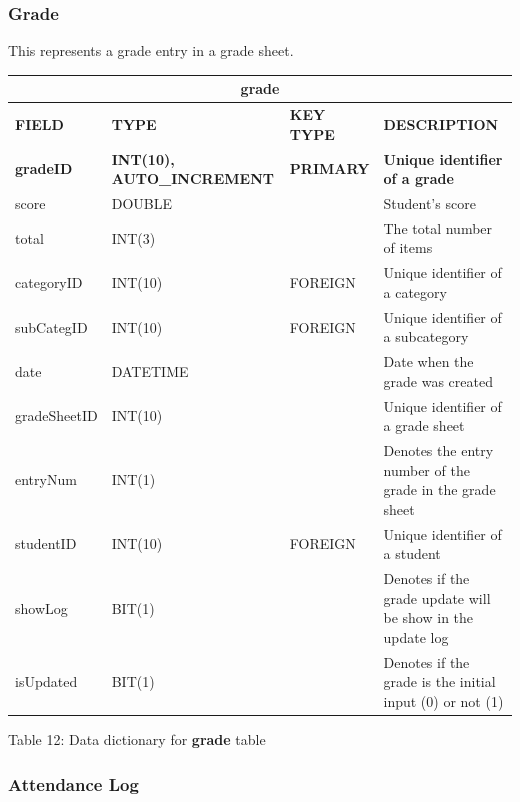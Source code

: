 \documentclass[11pt,a4paper,titlepage]{article}
\begin{document}
\subsubsection{Grade}

This represents a grade entry in a grade sheet.

\vspace{1cm}
\begin{longtable}{ |p{2.5cm}|p{4.5cm}|p{2.5cm}|p{3cm}|  }
    \hline
    \multicolumn{4}{|c|}{\textbf{grade}} \\
    \hline
    \textbf{FIELD}&\textbf{TYPE}&\textbf{KEY TYPE}&\textbf{DESCRIPTION}\\
    \hline
    \textbf{gradeID}  & \textbf{INT(10), AUTO\_INCREMENT} & \textbf{PRIMARY} & \textbf{Unique identifier of a grade}\\ \hline
    score   & DOUBLE   & & Student's score \\ \hline
    total   & INT(3)   & & The total number of items \\ \hline
    categoryID   & INT(10)   & FOREIGN & Unique identifier of a category \\ \hline
    subCategID   & INT(10)   & FOREIGN & Unique identifier of a subcategory \\ \hline
    date   & DATETIME   & & Date when the grade was created \\ \hline
    gradeSheetID   & INT(10)   & & Unique identifier of a grade sheet \\ \hline
    entryNum   & INT(1)   & & Denotes the entry number of the grade in the grade sheet \\ \hline
    studentID   & INT(10)   & FOREIGN & Unique identifier of a student \\ \hline
    showLog & BIT(1) & &  Denotes if the grade update will be show in the update log \\ \hline
    isUpdated & BIT(1) & & Denotes if the grade is the initial input (0) or not (1) \\ \hline
\end{longtable}
    
\vspace{.5cm}
\begin{center}
    Table 12: Data dictionary for \textbf{grade} table
\end{center}


\subsubsection{Attendance Log}
\end{document}
